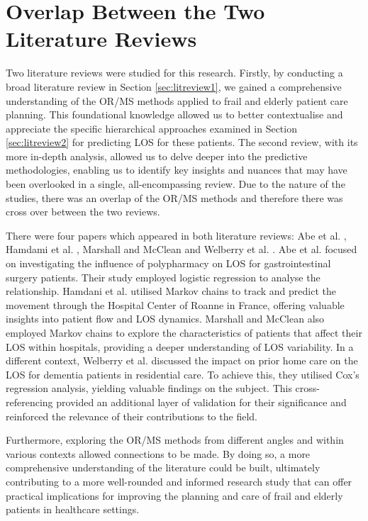 \documentclass[../thesis.tex]{subfiles}
\begin{document}
\section{Overlap Between the Two Literature Reviews}\label{sec:litdiscussion}
Two literature reviews were studied for this research. Firstly, by conducting a broad literature review in Section \ref{sec:litreview1}, we gained a comprehensive understanding of the OR/MS methods applied to frail and elderly patient care planning. This foundational knowledge allowed us to better contextualise and appreciate the specific hierarchical approaches examined in Section \ref{sec:litreview2} for predicting LOS for these patients. The second review, with its more in-depth analysis, allowed us to delve deeper into the predictive methodologies, enabling us to identify key insights and nuances that may have been overlooked in a single, all-encompassing review. Due to the nature of the studies, there was an overlap of the OR/MS methods and therefore there was cross over between the two reviews.


There were four papers which appeared in both literature reviews: Abe et al. \cite{Abe}, Hamdami et al. \cite{Hamdani}, Marshall and McClean \cite{Marshall2} and Welberry et al. \cite{Welberry}.
Abe et al. \cite{Abe} focused on investigating the influence of polypharmacy on LOS for gastrointestinal surgery patients. Their study employed logistic regression to analyse the relationship. Hamdani et al. \cite{Hamdani} utilised Markov chains to track and predict the movement through the Hospital Center of Roanne in France, offering valuable insights into patient flow and LOS dynamics. Marshall and McClean \cite{Marshall2} also employed Markov chains to explore the characteristics of patients that affect their LOS within hospitals, providing a deeper understanding of LOS variability. In a different context, Welberry et al. \cite{Welberry} discussed the impact on prior home care on the LOS for dementia patients in residential care.  To achieve this, they utilised Cox's regression analysis, yielding valuable findings on the subject. This cross-referencing provided an additional layer of validation for their significance and reinforced the relevance of their contributions to the field.

Furthermore, exploring the OR/MS methods from different angles and within various contexts allowed connections to be made. By doing so, a more comprehensive understanding of the literature could be built, ultimately contributing to a more well-rounded and informed research study that can offer practical implications for improving the planning and care of frail and elderly patients in healthcare settings.
\end{document}
